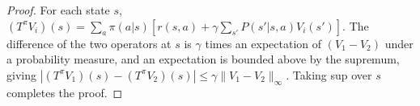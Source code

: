 \documentclass{article}
\theoremstyle{definition}
\begin{document}
\begin{proof}  For each state $s$,
$(T^\pi V_i)(s)=\sum_a\pi(a|s)[r(s,a)+\gamma\sum_{s'}P(s'|s,a)V_i(s')]$.
The difference of the two operators at $s$ is $\gamma$ times an
expectation of $(V_1-V_2)$ under a probability measure, and an
expectation is bounded above by the supremum, giving
$|(T^\pi V_1)(s)-(T^\pi V_2)(s)|\le\gamma\|V_1-V_2\|_\infty$.  Taking
sup over $s$ completes the proof.
\end{proof}
\end{document}
